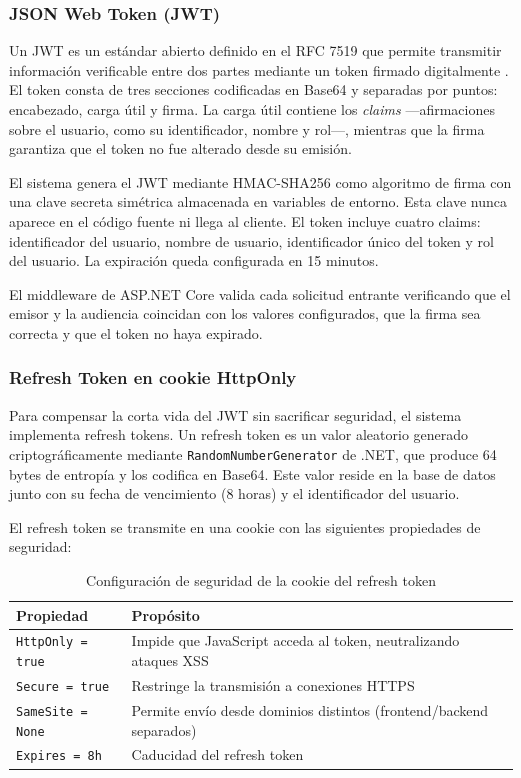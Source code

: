 \documentclass[12pt,letterpaper]{article}
\begin{document}
\subsubsection{JSON Web Token (JWT)}

Un JWT es un estándar abierto definido en el RFC 7519 que permite transmitir información verificable entre dos partes mediante un token firmado digitalmente \cite{rfc7519}. El token consta de tres secciones codificadas en Base64 y separadas por puntos: encabezado, carga útil y firma. La carga útil contiene los \textit{claims} —afirmaciones sobre el usuario, como su identificador, nombre y rol—, mientras que la firma garantiza que el token no fue alterado desde su emisión.

El sistema genera el JWT mediante HMAC-SHA256 como algoritmo de firma con una clave secreta simétrica almacenada en variables de entorno. Esta clave nunca aparece en el código fuente ni llega al cliente. El token incluye cuatro claims: identificador del usuario, nombre de usuario, identificador único del token y rol del usuario. La expiración queda configurada en 15 minutos.

El middleware de ASP.NET Core valida cada solicitud entrante verificando que el emisor y la audiencia coincidan con los valores configurados, que la firma sea correcta y que el token no haya expirado.

\subsubsection{Refresh Token en cookie HttpOnly}

Para compensar la corta vida del JWT sin sacrificar seguridad, el sistema implementa refresh tokens. Un refresh token es un valor aleatorio generado criptográficamente mediante \texttt{RandomNumberGenerator} de .NET, que produce 64 bytes de entropía y los codifica en Base64. Este valor reside en la base de datos junto con su fecha de vencimiento (8 horas) y el identificador del usuario.

El refresh token se transmite en una cookie con las siguientes propiedades de seguridad:

\begin{table}[H]
\centering
\caption{Configuración de seguridad de la cookie del refresh token}
\label{tab:cookie-config}
\begin{tabular}{|l|p{10cm}|}
\hline
\textbf{Propiedad} & \textbf{Propósito} \\ \hline
\texttt{HttpOnly = true} & Impide que JavaScript acceda al token, neutralizando ataques XSS \\ \hline
\texttt{Secure = true} & Restringe la transmisión a conexiones HTTPS \\ \hline
\texttt{SameSite = None} & Permite envío desde dominios distintos (frontend/backend separados) \\ \hline
\texttt{Expires = 8h} & Caducidad del refresh token \\ \hline
\end{tabular}
\end{table}
\end{document}
